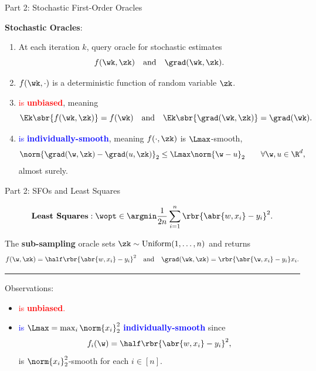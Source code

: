 \documentclass[mathserif,notheorems, hyperref={colorlinks, citecolor=blue, urlcolor=blue, linkcolor=blue}]{beamer}
\begin{document}
    \begin{frame}{Part 2: Stochastic First-Order Oracles}

        \textbf{Stochastic Oracles}:
        \begin{enumerate}
            \item At each iteration \( k \), query oracle \oracle{} for stochastic estimates 
                \[ f(\wk, \zk) \quad \text{and} \quad \grad(\wk, \zk). \] 
                \pause
            \item \( f(\wk, \cdot) \) is a deterministic function of random variable \( \zk \). 
                \pause
                \vspace{1ex}
            \item \textcolor{red}{\oracle{} is \textbf{unbiased}}, meaning 
            \[ \Ek\sbr{f(\wk, \zk)} = f(\wk) \quad \text{and} \quad \Ek\sbr{\grad(\wk, \zk)} = \grad(\wk). \]%
            \pause%
            \vspace{-2ex}
            \item \textcolor{blue}{\oracle{} is \textbf{individually-smooth}}, meaning \( f(\cdot, \zk) \) is \( \Lmax \)-smooth, 
                \begin{align*}
                    \norm{\grad(\w, \zk) - \grad(u, \zk)}_2 &\leq \Lmax \norm{\w - u}_2 \tag*{\(\forall \w, u \in \R^d \),} 
                \end{align*}
                almost surely.
        \end{enumerate}

    \end{frame}

    \begin{frame}{Part 2: SFOs and Least Squares}
        \vspace{-1ex}

        \[ \textbf{Least Squares}: \wopt \in \argmin \frac{1}{2n} \sum_{i=1}^n \rbr{\abr{w, x_i} - y_i}^2. \]
        
        \vspace{2ex} 
        
        The \textbf{sub-sampling} oracle sets \( \zk \sim \text{Uniform}(1, \ldots, n) \) and returns 
        \[ f(\w, \zk) =  \half \rbr{\abr{w, x_i} - y_i}^2 \quad \text{and} \quad \grad(\wk, \zk) = \rbr{\abr{\w, x_i} - y_i} x_i. \]

        \pause 
        \rule{\textwidth}{0.4pt}
        Observations: 
        \begin{itemize}
            \item \textcolor{red}{\oracle{} is \textbf{unbiased}.} 
            \item \textcolor{blue}{\oracle{} is \( \Lmax = \max_{i} \norm{x_i}^2_2 \) \textbf{individually-smooth}} since 
                    \[ f_{i}(\w) = \half \rbr{\abr{w, x_{i}} - y_{i}}^2, \]
                    is \( \norm{x_{i}}_2^2 \)-smooth for each \( i \in [n] \).
        \end{itemize}

    \end{frame}
\end{document}
